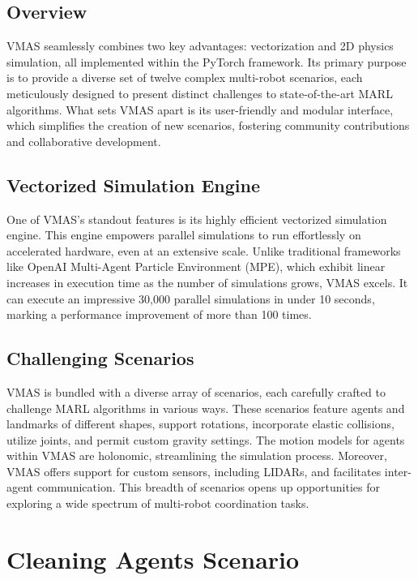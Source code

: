 \documentclass{scrartcl}
\begin{document}
\subsection{Overview}

VMAS seamlessly combines two key advantages: vectorization and 2D physics simulation, all implemented within the PyTorch framework. Its primary purpose is to provide a diverse set of twelve complex multi-robot scenarios, each meticulously designed to present distinct challenges to state-of-the-art MARL algorithms. What sets VMAS apart is its user-friendly and modular interface, which simplifies the creation of new scenarios, fostering community contributions and collaborative development.

\subsection{Vectorized Simulation Engine}

One of VMAS's standout features is its highly efficient vectorized simulation engine. This engine empowers parallel simulations to run effortlessly on accelerated hardware, even at an extensive scale. Unlike traditional frameworks like OpenAI Multi-Agent Particle Environment (MPE), which exhibit linear increases in execution time as the number of simulations grows, VMAS excels. It can execute an impressive 30,000 parallel simulations in under 10 seconds, marking a performance improvement of more than 100 times.

\subsection{Challenging Scenarios}

VMAS is bundled with a diverse array of scenarios, each carefully crafted to challenge MARL algorithms in various ways. These scenarios feature agents and landmarks of different shapes, support rotations, incorporate elastic collisions, utilize joints, and permit custom gravity settings. The motion models for agents within VMAS are holonomic, streamlining the simulation process. Moreover, VMAS offers support for custom sensors, including LIDARs, and facilitates inter-agent communication. This breadth of scenarios opens up opportunities for exploring a wide spectrum of multi-robot coordination tasks.

\newpage

\section{Cleaning Agents Scenario}
\end{document}
